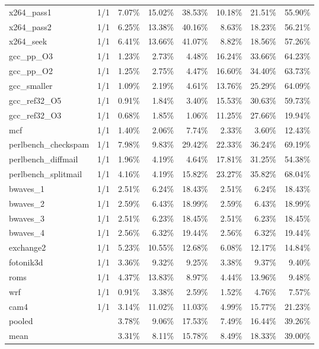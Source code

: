 \documentclass[10pt,a4paper,landscape]{article}
\begin{document}
{\begin{longtable}{lcrrrrrr}
x264\_pass1 & 1/1 & 7.07\% & 15.02\% & 38.53\% & 10.18\% & 21.51\% & 55.90\% \\
x264\_pass2 & 1/1 & 6.25\% & 13.38\% & 40.16\% & 8.63\% & 18.23\% & 56.21\% \\
x264\_seek & 1/1 & 6.41\% & 13.66\% & 41.07\% & 8.82\% & 18.56\% & 57.26\% \\
gcc\_pp\_O3 & 1/1 & 1.23\% & 2.73\% & 4.48\% & 16.24\% & 33.66\% & 64.23\% \\
gcc\_pp\_O2 & 1/1 & 1.25\% & 2.75\% & 4.47\% & 16.60\% & 34.40\% & 63.73\% \\
gcc\_smaller & 1/1 & 1.09\% & 2.19\% & 4.61\% & 13.76\% & 25.29\% & 64.09\% \\
gcc\_ref32\_O5 & 1/1 & 0.91\% & 1.84\% & 3.40\% & 15.53\% & 30.63\% & 59.73\% \\
gcc\_ref32\_O3 & 1/1 & 0.68\% & 1.85\% & 1.06\% & 11.25\% & 27.66\% & 19.94\% \\
mcf & 1/1 & 1.40\% & 2.06\% & 7.74\% & 2.33\% & 3.60\% & 12.43\% \\
perlbench\_checkspam & 1/1 & 7.98\% & 9.83\% & 29.42\% & 22.33\% & 36.24\% & 69.19\% \\
perlbench\_diffmail & 1/1 & 1.96\% & 4.19\% & 4.64\% & 17.81\% & 31.25\% & 54.38\% \\
perlbench\_splitmail & 1/1 & 4.16\% & 4.19\% & 15.82\% & 23.27\% & 35.82\% & 68.04\% \\
bwaves\_1 & 1/1 & 2.51\% & 6.24\% & 18.43\% & 2.51\% & 6.24\% & 18.43\% \\
bwaves\_2 & 1/1 & 2.59\% & 6.43\% & 18.99\% & 2.59\% & 6.43\% & 18.99\% \\
bwaves\_3 & 1/1 & 2.51\% & 6.23\% & 18.45\% & 2.51\% & 6.23\% & 18.45\% \\
bwaves\_4 & 1/1 & 2.56\% & 6.32\% & 19.44\% & 2.56\% & 6.32\% & 19.44\% \\
exchange2 & 1/1 & 5.23\% & 10.55\% & 12.68\% & 6.08\% & 12.17\% & 14.84\% \\
fotonik3d & 1/1 & 3.36\% & 9.32\% & 9.25\% & 3.38\% & 9.37\% & 9.40\% \\
roms & 1/1 & 4.37\% & 13.83\% & 8.97\% & 4.44\% & 13.96\% & 9.48\% \\
wrf & 1/1 & 0.91\% & 3.38\% & 2.59\% & 1.52\% & 4.76\% & 7.57\% \\
cam4 & 1/1 & 3.14\% & 11.02\% & 11.03\% & 4.99\% & 15.77\% & 21.23\% \\
\midrule
pooled &  & 3.78\% & 9.06\% & 17.53\% & 7.49\% & 16.44\% & 39.26\% \\
mean &  & 3.31\% & 8.11\% & 15.78\% & 8.49\% & 18.33\% & 39.00\% \\
\end{longtable}
}
\end{document}

